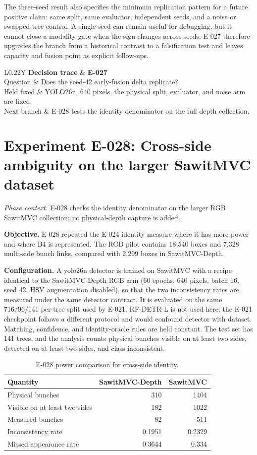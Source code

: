 \documentclass[preprint,12pt]{elsarticle}
\newcommand{\experiment}[2]{\par\medskip\Needspace{7\baselineskip}\section{Experiment #1: #2}}
\newcommand{\decisioncard}[4]{%
\begin{table}[H]\centering\small
\begin{tabularx}{\columnwidth}{L{0.22\columnwidth}Y}
\toprule
\textbf{Decision trace} & \textbf{#1}\\
Question & #2\\
Held fixed & #3\\
Next branch & #4\\
\bottomrule
\end{tabularx}
\end{table}}
\newcommand{\phasecontext}[1]{%
\par\smallskip\noindent\textit{Phase context.} #1\par\smallskip}
\begin{document}
The three-seed result also specifies the minimum replication pattern for a
future positive claim: same split, same evaluator, independent seeds, and a
noise or swapped-tree control. A single seed can remain useful for debugging,
but it cannot close a modality gate when the sign changes across seeds. E-027
therefore upgrades the branch from a historical contrast to a falsification
test and leaves capacity and fusion point as explicit follow-ups.

\decisioncard{E-027}{Does the seed-42 early-fusion delta replicate?}{YOLO26n, 640 pixels, the physical split, evaluator, and noise arm are fixed.}{E-028 tests the identity denominator on the full depth collection.}
\experiment{E-028}{Cross-side ambiguity on the larger SawitMVC dataset}
\phasecontext{E-028 checks the identity denominator on the larger RGB SawitMVC collection; no physical-depth capture is added.}
\textbf{Objective.} E-028 repeated the E-024 identity measure where it has
more power and where B4 is represented. The RGB pilot contains 18,540 boxes
and 7,328 multi-side bunch links, compared with 2,299 boxes in
SawitMVC-Depth.

\textbf{Configuration.} A yolo26n detector is trained on SawitMVC with a
recipe identical to the SawitMVC-Depth RGB arm (60 epochs, 640 pixels, batch
16, seed 42, HSV augmentation disabled), so that the two inconsistency rates
are measured under the same detector contract. It is evaluated on the
same 716/96/141 per-tree split used by E-021. RF-DETR-L is not used here: the
E-021 checkpoint follows a different protocol and would confound detector with
dataset. Matching, confidence, and
identity-oracle rules are held constant. The test set has 141 trees, and the
analysis counts physical bunches visible on at least two sides, detected on
at least two sides, and class-inconsistent.

\begin{table}[H]
\centering
\caption{E-028 power comparison for cross-side identity.}
\label{tab:e028}
\begin{tabular}{lrr}
\toprule
Quantity & SawitMVC-Depth & SawitMVC\\
\midrule
Physical bunches & 310 & 1404\\
Visible on at least two sides & 182 & 1022\\
Measured bunches & 82 & 511\\
Inconsistency rate & 0.1951 & 0.2329\\
Missed appearance rate & 0.3644 & 0.334\\
\bottomrule
\end{tabular}
\end{table}
\end{document}
